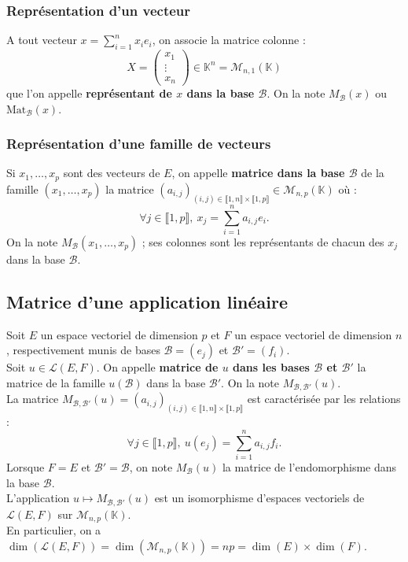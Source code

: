 \documentclass[french]{article}
\newcommand{\K}{\mathbb{K}}
\theoremstyle{plain}
\theoremstyle{definition}
\theoremstyle{remark}
\begin{document}
\subsubsection*{Représentation d'un vecteur}

A tout vecteur $x=\displaystyle\sum_{i=1}^n x_ie_i$, on associe la matrice colonne :
$$X=\begin{pmatrix}
	x_1\\
	\vdots\\
	x_n
\end{pmatrix}\in\K^n=\mathcal{M}_{n,1}(\K)$$ que l'on appelle \textbf{représentant de $x$ dans la base $\mathcal{B}$}. On la note $M_\mathcal{B}(x)$ ou $\text{Mat}_\mathcal{B}(x)$.

\subsubsection*{Représentation d'une famille de vecteurs}

Si $x_1,\ldots,x_p$ sont des vecteurs de $E$, on appelle \textbf{matrice dans la base $\mathcal{B}$} de la famille $(x_1,\ldots,x_p)$ la matrice $(a_{i,j})_{(i,j)\in\llbracket1,n\rrbracket\times\llbracket1,p\rrbracket}\in\mathcal{M}_{n,p}(\K)$ où :
$$\forall j\in\llbracket1,p\rrbracket,\ x_j=\sum_{i=1}^{n}a_{i,j}e_i.$$
On la note $M_\mathcal{B}(x_1,\ldots,x_p)$ ; ses colonnes sont les représentants de chacun des $x_j$ dans la base $\mathcal{B}$.

\subsection{Matrice d'une application linéaire}

Soit $E$ un espace vectoriel de dimension $p$ et $F$ un espace vectoriel de dimension $n$, respectivement munis de bases $\mathcal{B}=(e_j)$ et $\mathcal{B}'=(f_i)$.\\
Soit $u\in\mathcal{L}(E,F)$. On appelle \textbf{matrice de $u$ dans les bases $\mathcal{B}$ et $\mathcal{B}'$} la matrice de la famille $u(\mathcal{B})$ dans la base $\mathcal{B}'$. On la note $M_{\mathcal{B},\mathcal{B}'}(u)$.\\
La matrice $M_{\mathcal{B},\mathcal{B}'}(u)=(a_{i,j})_{(i,j)\in\llbracket1,n\rrbracket\times\llbracket1,p\rrbracket}$ est caractérisée par les relations :
$$\forall j\in\llbracket1,p\rrbracket,\ u(e_j)=\sum_{i=1}^{n}a_{i,j}f_i.$$
Lorsque $F=E$ et $\mathcal{B}'=\mathcal{B}$, on note $M_\mathcal{B}(u)$ la matrice de l'endomorphisme dans la base $\mathcal{B}$.\\
L'application $u\mapsto M_{\mathcal{B},\mathcal{B}'}(u)$ est un isomorphisme d'espaces vectoriels de $\mathcal{L}(E,F)$ sur $\mathcal{M}_{n,p}(\K)$.\\
En particulier, on a $\dim(\mathcal{L}(E,F))=\dim(\mathcal{M}_{n,p}(\K))=np=\dim(E)\times\dim(F)$.
\end{document}
